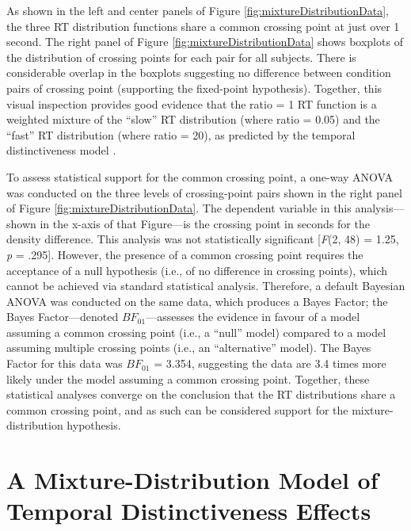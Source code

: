 \documentclass[a4paper, jou, natbib]{apa6}
\begin{document}
As shown in the left and center panels of Figure \ref{fig:mixtureDistributionData}, the three RT distribution functions share a common crossing point at just over 1 second. The right panel of Figure \ref{fig:mixtureDistributionData} shows boxplots of the distribution of crossing points for each pair for all subjects. There is considerable overlap in the boxplots suggesting no difference between condition pairs of crossing point (supporting the fixed-point hypothesis). Together, this visual inspection provides good evidence that the ratio = 1 RT function is a weighted mixture of the ``slow'' RT distribution (where ratio = 0.05) and the ``fast'' RT distribution (where ratio = 20), as predicted by the temporal distinctiveness model \cite{Grange2015}.

To assess statistical support for the common crossing point, a one-way ANOVA was conducted on the three levels of crossing-point pairs shown in the right panel of Figure \ref{fig:mixtureDistributionData}. The dependent variable in this analysis---shown in the x-axis of that Figure---is the crossing point in seconds for the density difference. This analysis was not statistically significant [\emph{F}(2, 48) = 1.25, \emph{p} = .295]. However, the presence of a common crossing point requires the acceptance of a null hypothesis (i.e., of no difference in crossing points), which cannot be achieved via standard statistical analysis. Therefore, a default Bayesian ANOVA \cite{Rouder2012} was conducted on the same data, which produces a Bayes Factor; the Bayes Factor---denoted $BF_{01}$---assesses the evidence in favour of a model assuming a common crossing point (i.e., a ``null'' model) compared to a model assuming multiple crossing points (i.e., an ``alternative'' model). The Bayes Factor for this data was $BF_{01}$ = 3.354, suggesting the data are 3.4 times more likely under the model assuming a common crossing point. Together, these statistical analyses converge on the conclusion that the RT distributions share a common crossing point, and as such can be considered support for the mixture-distribution hypothesis.

\section{A Mixture-Distribution Model of Temporal Distinctiveness Effects}
\end{document}
